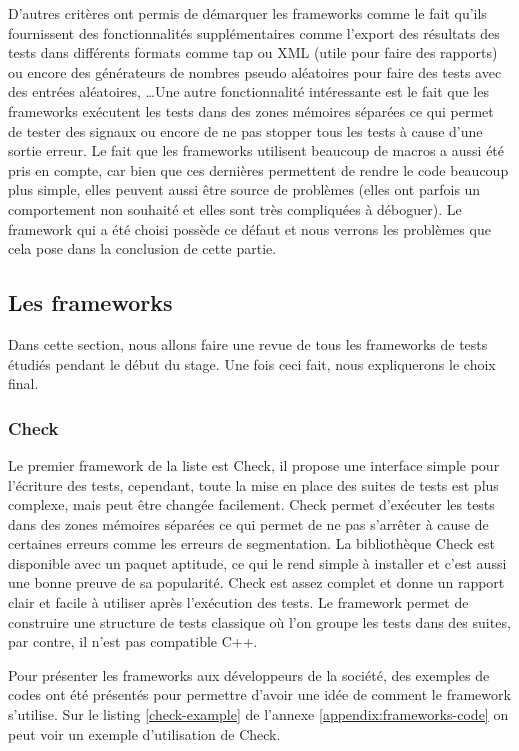 \documentclass[a4paper]{article}
\begin{document}
D'autres critères ont permis de démarquer les frameworks comme le fait qu'ils
fournissent des fonctionnalités supplémentaires comme l'export des résultats des
tests dans différents formats comme \gls{tap} ou XML (utile pour faire des
rapports) ou encore des générateurs de nombres pseudo aléatoires pour faire des
tests avec des entrées aléatoires, \dots Une autre fonctionnalité intéressante
est le fait que les frameworks exécutent les tests dans des zones mémoires
séparées ce qui permet de tester des signaux ou encore de ne pas stopper tous les
tests à cause d'une sortie erreur. Le fait que les frameworks utilisent beaucoup
de macros a aussi été pris en compte, car bien que ces dernières permettent de
rendre le code beaucoup plus simple, elles peuvent aussi être source de
problèmes (elles ont parfois un comportement non souhaité et elles sont très
compliquées à déboguer). Le framework qui a été choisi possède ce défaut et nous
verrons les problèmes que cela pose dans la conclusion de cette partie.
\subsection{Les frameworks}%

Dans cette section, nous allons faire une revue de tous les frameworks de tests
étudiés pendant le début du stage. Une fois ceci fait, nous expliquerons le
choix final.

\subsubsection*{Check}

Le premier framework de la liste est Check, il propose une interface simple pour
l'écriture des tests, cependant, toute la mise en place des suites de tests est
plus complexe, mais peut être changée facilement. Check permet d'exécuter les
tests dans des zones mémoires séparées ce qui permet de ne pas s'arrêter à cause
de certaines erreurs comme les erreurs de segmentation. La bibliothèque Check
est disponible avec un paquet aptitude, ce qui le rend simple à installer et
c'est aussi une bonne preuve de sa popularité. Check est assez complet et donne
un rapport clair et facile à utiliser après l'exécution des tests. Le framework
permet de construire une structure de tests classique où l'on groupe les tests
dans des suites, par contre, il n'est pas compatible C++.

Pour présenter les frameworks aux développeurs de la société, des exemples de
codes ont été présentés pour permettre d'avoir une idée de comment le framework
s'utilise. Sur le listing \ref{check-example} de l'annexe
\ref{appendix:frameworks-code} on peut voir un exemple d'utilisation de Check.
\end{document}
